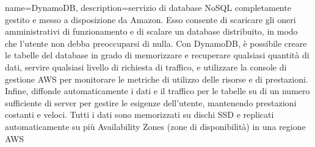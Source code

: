 {
	name=DynamoDB,
	description={servizio di database NoSQL completamente gestito e messo a disposizione da Amazon. Esso consente di scaricare gli oneri amministrativi di funzionamento e di scalare un database distribuito, in modo che l'utente non debba preoccuparsi di nulla.
		Con DynamoDB, è possibile creare le tabelle del database in grado di memorizzare e recuperare qualsiasi quantità di dati, servire qualsiasi livello di richiesta di traffico, e utilizzare la console di gestione AWS per monitorare le metriche di utilizzo delle risorse e di prestazioni. Infine, diffonde automaticamente i dati e il traffico per le tabelle su di un numero sufficiente di server per gestire le esigenze dell'utente, mantenendo prestazioni costanti e veloci. Tutti i dati sono memorizzati su dischi SSD e replicati automaticamente su più Availability Zones (zone di disponibilità) in una regione AWS}
}
